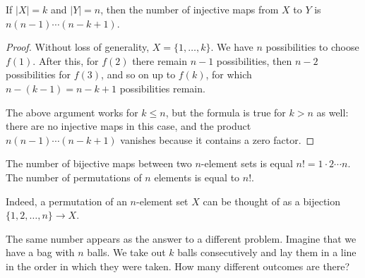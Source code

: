 \begin{page}
\setcounter{section}{2}
\setcounter{subsection}{3}
\setcounter{dfn}{8}
\label{portion:55}

\begin{thm}
If $|X|=k$ and $|Y|=n$, then the number of injective maps from $X$ to $Y$ is $n(n-1) \cdots (n-k+1)$.
\end{thm}

\end{page}

\begin{page}
\setcounter{section}{2}
\setcounter{subsection}{3}
\setcounter{dfn}{8}
\label{portion:56}

\begin{proof}
Without loss of generality, $X = \{1, \ldots, k\}$.
We have $n$ possibilities to choose $f(1)$.
After this, for $f(2)$ there remain $n-1$ possibilities, then $n-2$ possibilities for $f(3)$,
and so on up to $f(k)$, for which $n-(k-1) = n-k+1$ possibilities remain.

The above argument works for $k \le n$, but the formula is true for $k > n$ as well:
there are no injective maps in this case, and the product $n(n-1) \cdots (n-k+1)$ vanishes because it contains a zero factor.
\end{proof}


\end{page}

\begin{page}
\setcounter{section}{2}
\setcounter{subsection}{3}
\setcounter{dfn}{9}
\label{portion:58}

\begin{cor}
\label{cor:NumberOfBijections}
The number of bijective maps between two $n$-element sets is equal $n! = 1 \cdot 2 \cdots n$.
The number of permutations of $n$ elements is equal to $n!$.
\end{cor}

\end{page}

\begin{page}
\setcounter{section}{2}
\setcounter{subsection}{3}
\setcounter{dfn}{9}
\label{portion:59}

Indeed, a permutation of an $n$-element set $X$ can be thought of as a bijection $\{1, 2, \ldots, n\} \to X$.

The same number appears as the answer to a different problem.
Imagine that we have a bag with $n$ balls.
We take out $k$ balls consecutively and lay them in a line in the order in which they were taken.
How many different outcomes are there?


\end{page}

